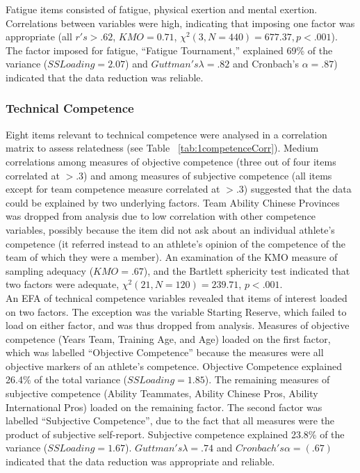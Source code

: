 {
Fatigue items consisted of fatigue, physical exertion and mental exertion. Correlations between variables were high, indicating that imposing one factor was appropriate (all $r's > .62$, $KMO = 0.71$, $\chi^2(3, N = 440) =  677.37, p < .001$).  The factor imposed for fatigue, ``Fatigue Tournament,'' explained 69\% of the variance ($SS Loading = 2.07$) and $Guttman's \lambda =.82$ and Cronbach's $\alpha = .87$) indicated that the data reduction was reliable.



\subsubsection{Technical Competence}
Eight items relevant to technical competence were analysed in a correlation matrix to assess relatedness (see Table ~\ref{tab:1competenceCorr}). Medium correlations among measures of objective competence (three out of four items correlated at $> .3$) and among measures of subjective competence (all items except for team competence measure correlated at $> .3$) suggested that the data could be explained by two underlying factors. Team Ability Chinese Provinces was dropped from analysis due to low correlation with other competence variables, possibly because the item did not ask about an individual athlete’s competence (it referred instead to an athlete’s opinion of the competence of the team of which they were a member). An examination of the KMO measure of sampling adequacy ($KMO = .67$), and the Bartlett sphericity test indicated that two factors were adequate, $\chi^2(21, N = 120) = 239.71$, $p < .001$. \\

An EFA of technical competence variables revealed that items of interest loaded on two factors. The exception was the variable Starting Reserve, which failed to load on either factor, and was thus dropped from analysis. Measures of objective competence (Years Team, Training Age, and Age) loaded on the first factor, which was labelled ``Objective Competence'' because the measures were all objective markers of an athlete's competence.  Objective Competence explained 26.4\% of the total variance ($SS Loading = 1.85$). The remaining measures of subjective competence (Ability Teammates, Ability Chinese Pros, Ability International Pros) loaded on the remaining factor.  The second factor was labelled ``Subjective Competence'', due to the fact that all measures were the product of subjective self-report.  Subjective competence explained 23.8\% of the variance ($SS Loading = 1.67$). $Guttman's \lambda =.74$ and $Cronbach's \alpha = (.67)$ indicated that the data reduction was appropriate and reliable.

}
